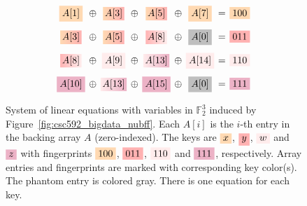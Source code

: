 \begin{figure}[H]
\centering  
\[
\setlength{\arraycolsep}{2pt}
\begin{array}{ccccccccc}

\mathcolorbox{lightorange}{A[1]} 
&\oplus& \gradientmathbox{lightorange}{lightred}{A[3]} 
&\oplus& \gradientmathbox{lightorange}{lightred}{A[5]} 
&\oplus& \mathcolorbox{lightorange}{A[7]} 
&=& \mathcolorbox{lightorange}{100}\\[1em]

\gradientmathbox{lightorange}{lightred}{A[3]}
&\oplus& \gradientmathbox{lightorange}{lightred}{A[5]}
&\oplus& \gradientmathbox{lightred}{lightpink}{A[8]} 
&\oplus& \mathcolorbox{lightgray}{A[0]} 
&=& \mathcolorbox{lightred}{011}\\[1em]

\gradientmathbox{lightred}{lightpink}{A[8]}
&\oplus& \mathcolorbox{lightpink}{A[9]} 
&\oplus& \gradientmathbox{lightpink}{lightpurple}{A[13]} 
&\oplus& \mathcolorbox{lightpink}{A[14]}
&=& \mathcolorbox{lightpink}{110}\\[1em]

\mathcolorbox{lightpurple}{A[10]} 
&\oplus& \gradientmathbox{lightpink}{lightpurple}{A[13]} 
&\oplus& \mathcolorbox{lightpurple}{A[15]} 
&\oplus& \mathcolorbox{lightgray}{A[0]} 
&=& \mathcolorbox{lightpurple}{111}
\end{array}
\]
\caption{System of linear equations with variables in $\mathbb{F}^3_2$ induced by Figure~\ref{fig:csc592_bigdata_nubff}. Each $A[i]$ is the $i$-th entry in the 
backing array $A$ (zero-indexed). The keys are $\mathcolorbox{lightorange}{x}$, $\mathcolorbox{lightred}{y}$, $\mathcolorbox{lightpink}{w}$ and 
$\mathcolorbox{lightpurple}{z}$ with fingerprints $\mathcolorbox{lightorange}{100}$, $\mathcolorbox{lightred}{011}$, $\mathcolorbox{lightpink}{110}$ and 
$\mathcolorbox{lightpurple}{111}$, respectively. Array entries and fingerprints are marked with corresponding key color(s). The phantom entry is colored gray. 
There is one equation for each key. }
\label{fig:csc592_bigdata_nusoe}
\end{figure}